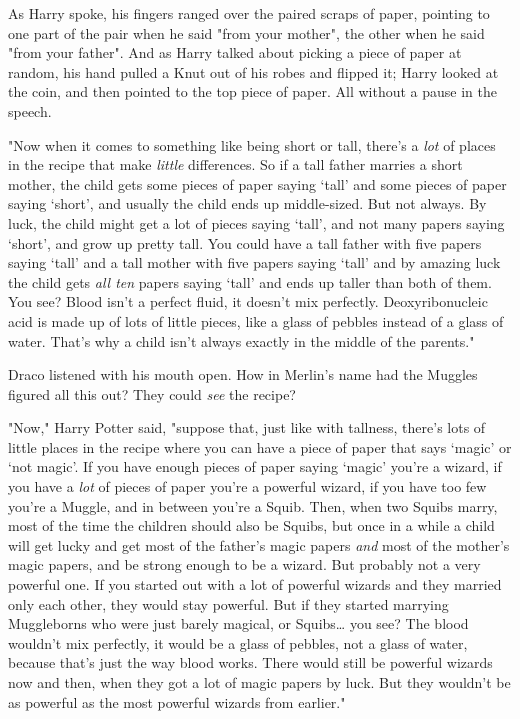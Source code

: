 As Harry spoke, his fingers ranged over the paired scraps of paper, pointing to 
one part of the pair when he said "from your mother", the other when he said 
"from your father". And as Harry talked about picking a piece of paper at 
random, his hand pulled a Knut out of his robes and flipped it; Harry looked at 
the coin, and then pointed to the top piece of paper. All without a pause in 
the speech.

"Now when it comes to something like being short or tall, there's a \emph{lot} 
of places in the recipe that make \emph{little} differences. So if a tall 
father marries a short mother, the child gets some pieces of paper saying 
`tall' and some pieces of paper saying `short', and usually the child ends up 
middle-sized. But not always. By luck, the child might get a lot of pieces 
saying `tall', and not many papers saying `short', and grow up pretty tall. You 
could have a tall father with five papers saying `tall' and a tall mother with 
five papers saying `tall' and by amazing luck the child gets \emph{all ten} 
papers saying `tall' and ends up taller than both of them. You see? Blood isn't 
a perfect fluid, it doesn't mix perfectly. Deoxyribonucleic acid is made up of 
lots of little pieces, like a glass of pebbles instead of a glass of water. 
That's why a child isn't always exactly in the middle of the parents."

Draco listened with his mouth open. How in Merlin's name had the Muggles 
figured all this out? They could \emph{see} the recipe?

"Now," Harry Potter said, "suppose that, just like with tallness, there's lots 
of little places in the recipe where you can have a piece of paper that says 
`magic' or `not magic'. If you have enough pieces of paper saying `magic' 
you're a wizard, if you have a \emph{lot} of pieces of paper you're a powerful 
wizard, if you have too few you're a Muggle, and in between you're a Squib. 
Then, when two Squibs marry, most of the time the children should also be 
Squibs, but once in a while a child will get lucky and get most of the father's 
magic papers \emph{and} most of the mother's magic papers, and be strong enough 
to be a wizard. But probably not a very powerful one. If you started out with a 
lot of powerful wizards and they married only each other, they would stay 
powerful. But if they started marrying Muggleborns who were just barely 
magical, or Squibs{\ldots} you see? The blood wouldn't mix perfectly, it would 
be a glass of pebbles, not a glass of water, because that's just the way blood 
works. There would still be powerful wizards now and then, when they got a lot 
of magic papers by luck. But they wouldn't be as powerful as the most powerful 
wizards from earlier."

